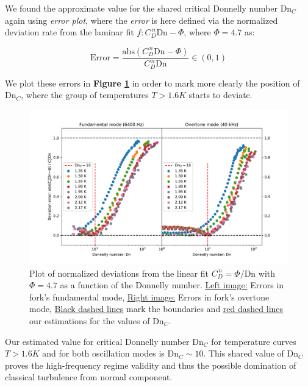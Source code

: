 \newpage

We found the approximate value for the shared critical Donnelly number $\text{Dn}_C$ again using \textit{error plot}, where the \textit{error} is here defined via the normalized deviation rate from the laminar fit $f: C_D^{\,n} \text{Dn} - \Phi$, where $\Phi = 4.7$ as:

\begin{equation}
\text{Error} = \frac{\text{abs}(C_D^{\,n} \text{Dn} - \Phi)}{C_D^{\,n}\text{Dn}} \in (0,1)
\end{equation}

We plot these errors in \textbf{Figure \ref{fork-error_donnelly}} in order to mark more clearly the position of $\text{Dn}_C$, where the group of temperatures $T > 1.6\unit{K}$ starts to deviate.

\begin{figure}[h]
	\hspace{-1.7cm}
	\includegraphics[width=1.2\textwidth]{graphics/results/fork-error_donnelly}
	\caption{Plot of normalized deviations from the linear fit $C_D^{\,n} =  \Phi / \text{Dn}$ with $\Phi = 4.7$ as a function of the Donnelly number. \underline{Left image:} Errors in fork's fundamental mode, \underline{Right image:} Errors in fork's overtone mode, \underline{Black dashed lines} mark the boundaries and \underline{red dashed lines} our estimations for the values of Dn${}_C$.
	}
	\label{fork-error_donnelly}
\end{figure}

Our estimated value for critical Donnelly number $\text{Dn}_C$ for temperature curves $T > 1.6\unit{K}$ and for both oscillation modes is $\text{Dn}_C \sim 10$. This shared value of $\text{Dn}_C$ proves the high-frequency regime validity and thus the possible domination of classical turbulence from normal component.

